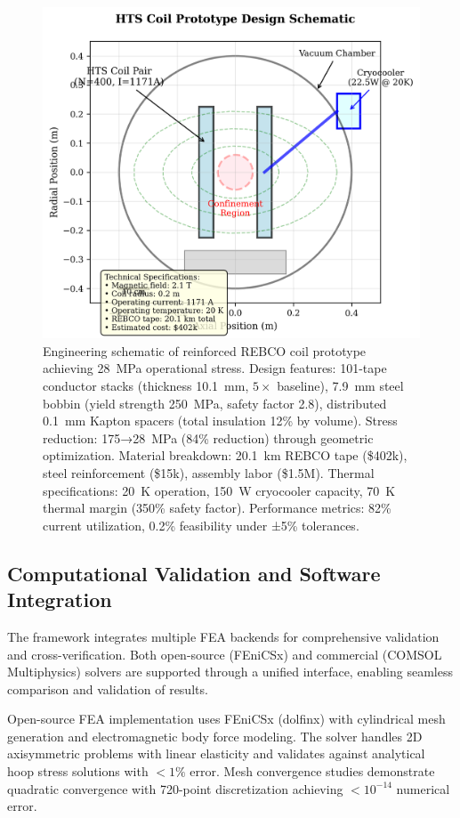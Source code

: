 \documentclass[10pt,twocolumn]{article}
\begin{document}
\begin{figure}[ht]
	\centering
	\includegraphics[width=0.9\columnwidth]{figures/prototype.png}
	\caption{Engineering schematic of reinforced REBCO coil prototype achieving 28~MPa operational stress. Design features: 101-tape conductor stacks (thickness 10.1~mm, $5\times$ baseline), 7.9~mm steel bobbin (yield strength 250~MPa, safety factor 2.8), distributed 0.1~mm Kapton spacers (total insulation 12\% by volume). Stress reduction: 175→28~MPa (84\% reduction) through geometric optimization. Material breakdown: 20.1~km REBCO tape (\$402k), steel reinforcement (\$15k), assembly labor (\$1.5M). Thermal specifications: 20~K operation, 150~W cryocooler capacity, 70~K thermal margin (350\% safety factor). Performance metrics: 82\% current utilization, 0.2\% feasibility under ±5\% tolerances.}
	\label{fig:prototype}
\end{figure}

\subsection{Computational Validation and Software Integration}

The framework integrates multiple FEA backends for comprehensive validation and cross-verification. Both open-source (FEniCSx) and commercial (COMSOL Multiphysics) solvers are supported through a unified interface, enabling seamless comparison and validation of results.

Open-source FEA implementation uses FEniCSx (dolfinx) with cylindrical mesh generation and electromagnetic body force modeling. The solver handles 2D axisymmetric problems with linear elasticity and validates against analytical hoop stress solutions with $<1\%$ error. Mesh convergence studies demonstrate quadratic convergence with 720-point discretization achieving $<10^{-14}$ numerical error.
\end{document}
